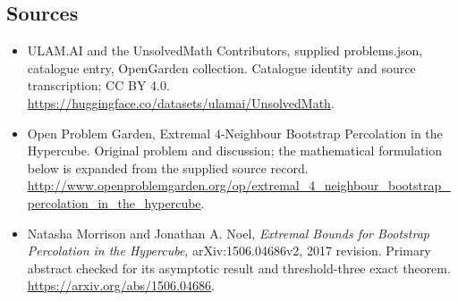 \documentclass[11pt,a4paper]{article}
\begin{document}
\subsection{Sources}
\begin{itemize}
\item[S1] ULAM.AI and the UnsolvedMath Contributors, supplied problems.json, catalogue entry, OpenGarden collection. Catalogue identity and source transcription; CC BY 4.0.
\url{https://huggingface.co/datasets/ulamai/UnsolvedMath}.
\item[S2] Open Problem Garden, Extremal $4$-Neighbour Bootstrap Percolation in the Hypercube. Original problem and discussion; the mathematical formulation below is expanded from the supplied source record.
\url{http://www.openproblemgarden.org/op/extremal_4_neighbour_bootstrap_percolation_in_the_hypercube}.

\item[R1] Natasha Morrison and Jonathan A. Noel, \emph{Extremal
Bounds for Bootstrap Percolation in the Hypercube}, arXiv:1506.04686v2,
2017 revision. Primary abstract checked for its asymptotic result and
threshold-three exact theorem.
\url{https://arxiv.org/abs/1506.04686}.

\end{itemize}
\end{document}
